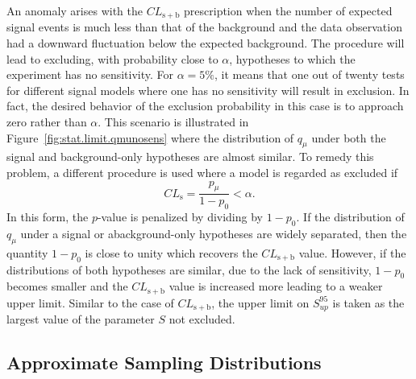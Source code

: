An anomaly arises with the $CL_\mathrm{s+b}$ prescription when the number of expected signal events is much less than that of 
the background and the data observation had a downward fluctuation below the expected background.
The procedure will lead to excluding, with probability close to $\alpha$, hypotheses to which the experiment has no sensitivity.
For $\alpha=5\%$, it means that one out of twenty tests for different signal models where one has no sensitivity will result in exclusion.
In fact, the desired behavior of the exclusion probability in this case is to approach zero rather than $\alpha$.
This scenario is illustrated in Figure~\ref{fig:stat.limit.qmunosens} where the distribution of $q_{\mu}$
under both the signal and background-only hypotheses are almost similar. 
To remedy this problem, a different procedure is used where a model is regarded as excluded if 
\begin{equation}
  CL_\mathrm{s}  = \frac
{p_{\mu}}
{1-p_{0}}
< \alpha.
\end{equation}
In this form, the $p$-value is penalized by dividing by $1-p_{0}$. 
If the distribution of $q_{\mu}$ under a signal or abackground-only hypotheses 
are widely separated, then 
the quantity $1-p_{0}$ is close to unity which recovers the $CL_\mathrm{s+b}$ value. However, if
the distributions of both hypotheses are similar, due to the lack of sensitivity, $1-p_{0}$ becomes smaller
and the $CL_\mathrm{s+b}$ value is increased more leading to a weaker upper limit. 
Similar to the case of $CL_\mathrm{s+b}$, the upper limit on $S_{up}^{95}$ is taken as the largest value of the parameter
$S$ not excluded.

\subsection{Approximate Sampling Distributions}

